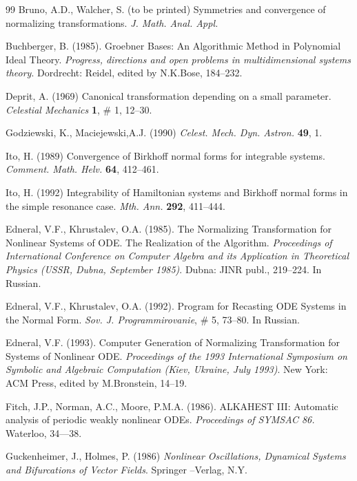 \begin{thebibliography}{99}
Bruno, A.D., Walcher, S. (to be printed) Symmetries and convergence of
normalizing transformations.
{\em J. Math. Anal. Appl.\/}

Buchberger, B. (1985).
Groebner Bases:  An Algorithmic Method in Polynomial Ideal Theory.
{\em Progress, directions and open problems in multidimensional
systems theory\/}. Dordrecht: Reidel, edited by N.K.Bose, 184--232.

Deprit, A. (1969) Canonical transformation depending on a small
parameter. {\em Celestial Mechanics} {\bf 1}, \# 1, 12--30.

Godziewski, K., Maciejewski,A.J. (1990)
{\em Celest. Mech. Dyn. Astron.\/} {\bf 49}, 1.

Ito, H. (1989) Convergence of Birkhoff normal forms for integrable systems.
{\em Comment. Math. Helv.\/} {\bf 64}, 412--461.

Ito, H. (1992) Integrability of Hamiltonian systems and Birkhoff normal 
forms in the simple resonance case.
{\em Mth. Ann.\/} {\bf 292}, 411--444.

Edneral, V.F., Khrustalev, O.A. (1985).
The Normalizing Transformation for Nonlinear Systems of ODE.  The 
Realization  of  the  Algorithm. {\em Proceedings of International 
Conference on Computer Algebra and its Application in  Theoretical  
Physics (USSR, Dubna, September 1985)\/}. Dubna: JINR publ.,  
219--224. In Russian.

Edneral, V.F., Khrustalev, O.A. (1992). Program  for  Recasting  ODE 
Systems in the Normal Form. {\em Sov. J. Programmirovanie\/}, \# 5, 
73--80. In Russian.

Edneral, V.F. (1993). Computer Generation of Normalizing Transformation  
for  Systems  of  Nonlinear   ODE. 
{\em  Proceedings  of the 1993 International Symposium on Symbolic  
and Algebraic Computation (Kiev,  Ukraine, July 1993)\/}. New York: ACM 
Press, edited by M.Bronstein, 14--19.
 
Fitch, J.P., Norman, A.C., Moore, P.M.A. (1986). ALKAHEST III: Automatic 
analysis of periodic weakly nonlinear ODEs. {\em  Proceedings of
SYMSAC 86.\/} Waterloo, 34---38.

Guckenheimer, J., Holmes, P. (1986) {\em Nonlinear Oscillations, 
Dynamical Systems and Bifurcations of Vector Fields}.  Springer
--Verlag, N.Y.


\end{thebibliography}
